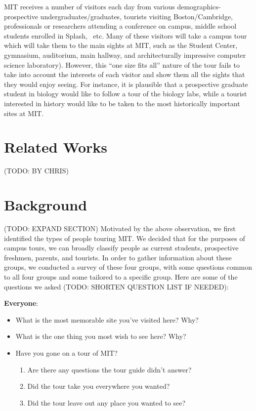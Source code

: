 \documentclass{sigchi}
\begin{document}
MIT receives a number of visitors each day from various demographics- prospective
undergraduates/graduates, tourists visiting Boston/Cambridge, professionals or researchers
attending a conference on campus, middle school students enrolled in Splash,  etc. Many of
these visitors will take a campus tour which will take them to the main sights at MIT, such as the Student Center, gymnasium, auditorium, main hallway, and architecturally impressive computer science laboratory). However, this ``one size fits all'' nature of the tour fails to take into account the interests of each visitor and show them all the sights that they would enjoy seeing. For instance, it is plausible that a prospective graduate student in biology would like to follow a tour of the biology labs, while a tourist interested in history would like to be taken to the most historically important sites at MIT. 

\section{Related Works}
(TODO: BY CHRIS)

\section{Background}

(TODO: EXPAND SECTION)
Motivated by the above observation, we first identified the types of people touring MIT. We decided that for the purposes of campus tours, we can broadly classify people as current students, prospective freshmen, parents, and tourists. In order to gather information about these groups, we conducted a survey of these four groups, with some questions common to all four groups and some tailored to a specific group. Here are some of the questions we asked (TODO: SHORTEN QUESTION LIST IF NEEDED):

\textbf{Everyone}:

\begin{itemize}
	\item What is the most memorable site you’ve visited here? Why?
	\item What is the one thing you most wish to see here? Why?
	\item Have you gone on a tour of MIT?
	\begin{enumerate}
		\item Are there any questions the tour guide didn’t answer?
		\item Did the tour take you everywhere you wanted?
		\item Did the tour leave out any place you wanted to see?
	\end{enumerate}
\end{itemize}
\end{document}
